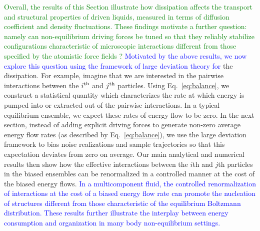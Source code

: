 \documentclass[superscriptaddress, twocolumn, prx, longbibliography, nofootinbib]{revtex4-1}
\newcommand{\tn}[1]{{\color{red}#1}}
\begin{document}
\textcolor{green}{Overall, the results of this Section illustrate how dissipation affects the transport and structural properties of driven liquids, measured in terms of diffusion coefficient and density fluctuations. These findings motivate a further question: namely can non-equilibrium driving forces be tuned so that they reliably stabilize configurations characteristic of microscopic interactions different from those specified by the atomistic force fields ?}
\textcolor{blue}{Motivated by the above results, we now explore this question using the framework of large deviation theory for} 
\tn{the dissipation. For example, imagine that we are interested in the pairwise interactions between the $i^{\rm th}$ and $j^{\rm th}$ particles. Using Eq.~\ref{eq:balance}, we construct a statistical quantity which characterizes the rate at which energy is pumped into or extracted out of the pairwise interactions. In a typical equilibrium ensemble, we expect these rates of energy flow to be zero. In the next section, instead of adding explicit driving forces to generate non-zero average energy flow rates (as described by Eq.~\ref{eq:balance}), we use the large deviation framework to bias noise realizations and sample trajectories so that this expectation deviates from zero on average.  Our main analytical and numerical results then show how the  effective interactions between the $i$th and $j$th particles in the biased ensembles can be renormalized in a controlled manner at the cost of the biased energy flows.}
\textcolor{blue}{ In a multicomponent fluid, the controlled renormalization of interactions at the cost of a biased energy flow rate can promote the nucleation of structures different from those characteristic of the equilibrium Boltzmann distribution. These results further illustrate the interplay between energy consumption and organization in many body non-equilibrium settings.}


\end{document}
